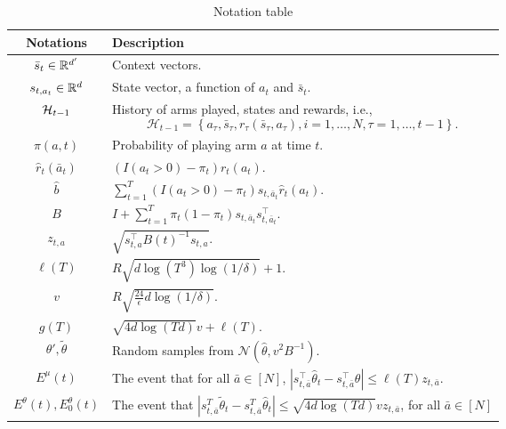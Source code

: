 \documentclass[letterpaper,11pt]{article}
\begin{document}
\begin{table}[h]
    \centering
    \renewcommand{\arraystretch}{1.2} %
    \begin{tabular}{c p{12cm}}
        \hline
        \textbf{Notations} & \textbf{Description} \\ 
        \hline
        $\bar{s}_t \in \mathbb{R}^{d'}$ & Context vectors.\\
        $s_{t,a_t} \in \mathbb{R}^d$ & State vector, a function of $a_t$ and $\bar{s}_t$.\\
        $\mathcal{H}_{t-1}$ & History of arms played, states and rewards, i.e., $$\mathcal{H}_{t-1}=\left\{a_\tau, \bar{s}_\tau, r_\tau\left(\bar{s}_\tau, a_\tau\right), i=1, \ldots, N, \tau=1, \ldots, t-1\right\}.$$\\
        $\pi(a,t)$ & Probability of playing arm $a$ at time $t$. \\
        $\hat{r}_t(\bar{a}_t)$ & $\left(I\left(a_t>0\right)-\pi_t\right) r_t\left(a_t\right)$. \\
        $\hat{b}$ & $\sum_{t=1}^T\left(I\left(a_t>0\right)-\pi_t\right) s_{t, \bar{a}_t} \hat{r}_t\left(a_t\right)$.\\
        $B$ & $I+\sum_{t=1}^T \pi_t\left(1-\pi_t\right) s_{t, \bar{a}_t} s_{t, \bar{a}_t}^\top$. \\
        $z_{t,a}$ & $\sqrt{s_{t, a}^\top B(t)^{-1} s_{t, a}}$.  \\
        $\ell(T)$ & $R \sqrt{d \log \left(T^3\right) \log (1 / \delta)}+1$. \\
        $v$ & $R \sqrt{\frac{24}{\epsilon} d \log (1 / \delta)}$.\\
        $g(T)$ & $\sqrt{4 d \log (T d)} v+\ell(T)$. \\
        $\theta', \tilde{\theta}$ & Random samples from $\mathcal{N}\left(\hat{\theta}, v^2 B^{-1}\right)$. \\
        $E^{\mu}(t)$ & The event that for all $\bar{a} \in [N]$, $\left|s_{t, \bar{a}}^\top \hat{\theta}_t-s_{t, \bar{a}}^\top \theta\right| \leq \ell(T) z_{t, \bar{a}}$. \\
        $E^{\theta}(t), E^{\theta}_0(t)$ & The event that $\left|s_{t, \bar{a}}^T \tilde{\theta}_t-s_{t, \bar{a}}^T \hat{\theta}_t\right| \leq \sqrt{4 d \log (T d)} v z_{t, \bar{a}}$, for all $\bar{a} \in [N]$\\
        \hline
    \end{tabular}
    \caption{Notation table}
    \label{tab:notation3}
\end{table}
\end{document}
